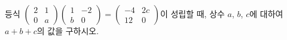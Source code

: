 \hspace*{2mm}\begin{minipage}[t]{\dimexpr\linewidth-2mm\relax}\vspace{0pt}
등식 $\begin{pmatrix} 2 & 1 \\ 0 & a \end{pmatrix}\begin{pmatrix} 1 & -2 \\ b & 0 \end{pmatrix}=\begin{pmatrix} -4 & 2c \\ 12 & 0 \end{pmatrix}$이 성립할 때, 상수 $a$, $b$, $c$에 대하여 $a+b+c$의 값을 구하시오.\end{minipage}
